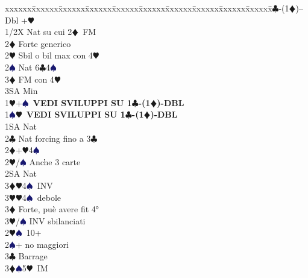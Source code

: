 \documentclass[a4paper,italian]{article}
\newcommand{\BC}{\textcolor{OliveGreen}{$\clubsuit$}}
\newcommand{\BD}{\textcolor{RedOrange}{$\vardiamondsuit$}}
\newcommand{\BH}{\textcolor{Red2}{$\varheartsuit${}}}
\newcommand{\BS}{\textcolor{MidnightBlue}{$\spadesuit${}}}
\newenvironment{bidtable}
{\begin{tabbing}

    xxxxxx\=xxxxxx\=xxxxxx\=xxxxxx\=xxxxxx\=xxxxxx\=xxxxxx\=xxxxxx\=xxxxxx\=xxxxxx\=\kill}
{\end{tabbing} }%
\begin{document}
\begin{multicols}{2}
                                        \begin{bidtable}
                                            1\BC-(1\BD)--\+\\
                                            Dbl +\BH \+\\
                                            1/2X \> Nat su cui 2\BD\ FM\\
                                            2\BD \> Forte generico\\
                                            2\BH \> Sbil o bil max con 4\BH \\
                                            2\BS \> Nat 6\BC 4\BS \\
                                            3\BD \> FM con 4\BH \+\\
                                            3SA \> Min\-\-\\
                                            1\BH {}+\BS\ \textbf{VEDI SVILUPPI SU 1\BC -(1\BD )-DBL}\\
                                            1\BS {}\BH\ \textbf{VEDI SVILUPPI SU 1\BC -(1\BD )-DBL}\\
                                            1SA \> Nat\\
                                            2\BC \> Nat forcing fino a 3\BC \\
                                            2\BD {}+\BH 4\BS \+\\
                                            2\BH/\BS \> Anche 3 carte\\
                                            2SA \> Nat\+\\
                                            3\BD {}\BH 4\BS\ INV\\
                                            3\BH {}\BH 4\BS\ debole\-\\
                                            3\BD \> Forte, puè avere fit 4°\\
                                            3\BH/\BS \> INV sbilanciati\-\\
                                            2\BH {}\BS\ 10+\\
                                            2\BS {}+ no maggiori\\
                                            3\BC \> Barrage\\
                                            3\BD {}\BS 5\BH\ IM\-

\end{bidtable}
\end{multicols}
\end{document}
